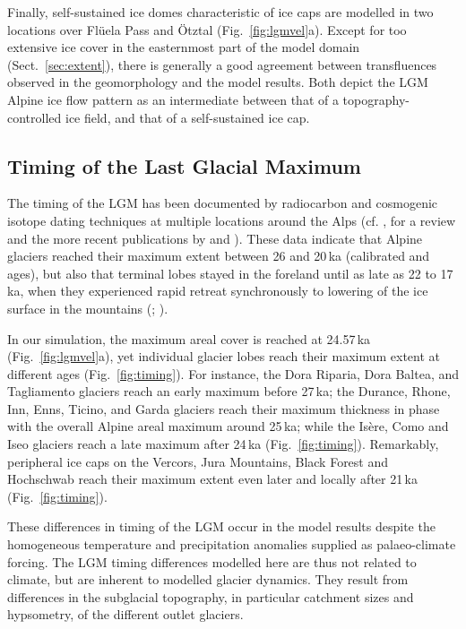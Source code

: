 \documentclass[tc, manuscript]{copernicus}
\begin{document}
    Finally, self-sustained ice domes characteristic of ice caps are modelled
    in two locations over Flüela Pass and Ötztal (Fig.~\ref{fig:lgmvel}a).
    Except for too extensive ice cover in the easternmost part of the model
    domain (Sect.~\ref{sec:extent}), there is generally a good agreement
    between transfluences observed in the geomorphology and the model results.
    Both depict the LGM Alpine ice flow pattern as an intermediate between that
    of a topography-controlled ice field, and that of a self-sustained ice cap.


\subsection{Timing of the Last Glacial Maximum}
\label{sec:timing}

    The timing of the LGM has been documented by radiocarbon and cosmogenic
    isotope dating techniques at multiple locations around the Alps (cf.
    \citealp[Fig.~5]{Wirsig.etal.2016}, for a review and the more recent
    publications by \citealp{Monegato.etal.2017} and
    \citealp{Federici.etal.2017}). These
    data indicate that Alpine glaciers reached their maximum extent between 26
    and 20\,ka (calibrated  and  ages), but also
    that terminal lobes stayed in the foreland until as late as 22 to 17\,ka,
    when they experienced rapid retreat synchronously to lowering of the ice
    surface in the mountains (\citealp[Fig.~5]{Wirsig.etal.2016};
    \citealp[Fig.~3]{Monegato.etal.2017}).

    In our simulation, the maximum areal cover is reached at 24.57\,ka
    (Fig.~\ref{fig:lgmvel}a), yet individual glacier lobes reach their
    maximum extent at different ages (Fig.~\ref{fig:timing}). For instance, the
    Dora Riparia, Dora Baltea, and Tagliamento glaciers reach an early maximum before
    27\,ka; the Durance, Rhone, Inn, Enns, Ticino, and Garda glaciers reach
    their maximum thickness in phase with the overall Alpine areal maximum
    around 25\,ka; while the Isère, Como and Iseo glaciers reach a late maximum
    after 24\,ka (Fig.~\ref{fig:timing}). Remarkably, peripheral ice caps on
    the Vercors, Jura Mountains, Black Forest and Hochschwab reach their
    maximum extent even later and locally after 21\,ka (Fig.~\ref{fig:timing}).

    These differences in timing of the LGM occur in the model results despite
    the homogeneous temperature and precipitation anomalies supplied as
    palaeo-climate forcing. The LGM timing differences modelled here are
    thus not related to climate, but are inherent to modelled glacier dynamics.
    They result from differences in the subglacial topography, in particular
    catchment sizes and hypsometry, of the different outlet glaciers.
\end{document}
